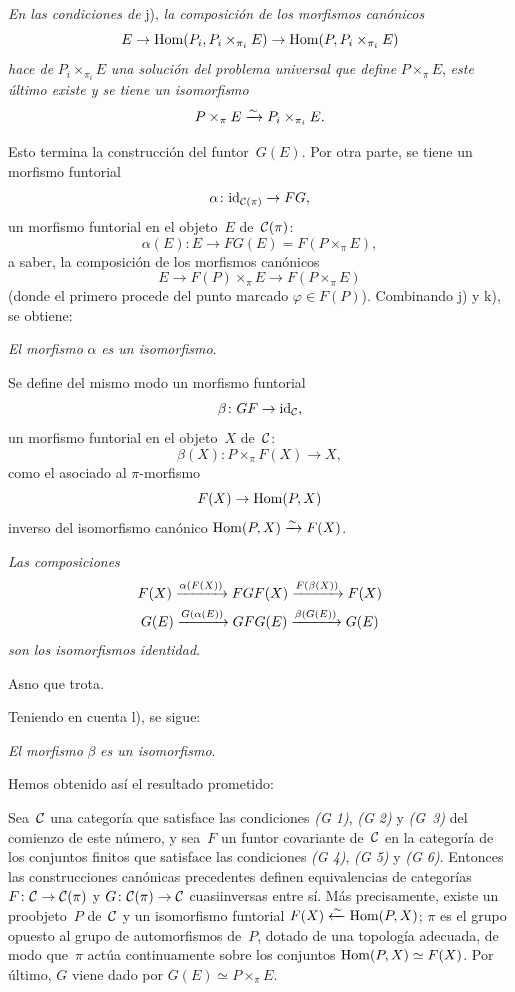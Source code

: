 \begin{enumerateb}
\item[k)] \emph{En las condiciones de} j), \emph{la composición de los
morfismos canónicos}
$$
E\to\Hom(P_i,P_i\times_{\pi_i}E)\to\Hom(P,P_i\times_{\pi_i}E)
$$
\emph{hace de} $P_i\times_{\pi_i}E$ \emph{una solución del problema
universal que define} $P\times_{\pi}E$, \ie \emph{este último existe y se
tiene un isomorfismo}
$$
P\times_{\pi}E\isomto P_i\times_{\pi_i}E.
$$

Esto termina la construcción del funtor~$G(E)$. Por otra parte, se tiene un
morfismo funtorial
$$
\alpha\colon\id_{\cal{C}(\pi)}\to FG,
$$
\ie un morfismo funtorial en el objeto~$E$ de~$\cal{C}(\pi)$:
$$
\alpha(E)\colon E\to FG(E)=F(P\times_{\pi}E),
$$
a saber, la composición de los morfismos canónicos
$$
E\to F(P)\times_{\pi}E\to F(P\times_{\pi}E)
$$
(donde el primero procede del punto marcado $\varphi\in F(P)$). Combinando
j) y k), se obtiene:

\item[l)] \emph{El morfismo} $\alpha$ \emph{es un isomorfismo}.

Se define del mismo modo un morfismo funtorial
$$
\beta\colon GF\to\id_{\cal{C}},
$$
\ie un morfismo funtorial en el objeto~$X$ de~$\cal{C}$:
$$
\beta(X)\colon P\times_{\pi}F(X)\to X,
$$
como
el asociado al $\pi$-morfismo
$$
F(X)\to\Hom(P,X)
$$
inverso del isomorfismo canónico $\Hom(P,X)\isomto F(X)$.

\item[m)] \emph{Las composiciones}
\begin{gather*}
F(X)\lto{\alpha(F(X))}FGF(X)\lto{F(\beta(X))}F(X)\\
G(E)\lto{G(\alpha(E))}GFG(E)\lto{\beta(G(E))}G(E)
\end{gather*}
\emph{son los isomorfismos identidad}.

Asno que trota.

Teniendo en cuenta l), se sigue:

\item[n)] \emph{El morfismo} $\beta$ \emph{es un isomorfismo}.

Hemos obtenido así el resultado prometido:
\end{enumerateb}

\begin{theoreme}
\label{V.4.1}
Sea~$\cal{C}$ una categoría que satisface las condiciones \emph{(G 1)},
\emph{(G 2)} y \emph{(G~3)} del comienzo de este número, y sea~$F$ un
funtor covariante de~$\cal{C}$ en la categoría de los conjuntos finitos que
satisface las condiciones \emph{(G 4)}, \emph{(G 5)} y \emph{(G 6)}.
Entonces las construcciones canónicas precedentes definen equivalencias de
categorías $F\colon\cal{C}\to\cal{C}(\pi)$ y
$G\colon\cal{C}(\pi)\to\cal{C}$ cuasiinversas entre sí. Más precisamente,
existe un proobjeto~$P$ de~$\cal{C}$ y un isomorfismo funtorial
$F(X)\isomfrom\Hom(P,X)$; $\pi$ es el grupo opuesto al grupo de
automorfismos de~$P$, dotado de una topología adecuada, de modo que~$\pi$
actúa continuamente sobre los conjuntos $\Hom(P,X)\simeq F(X)$. Por último,
$G$ viene dado por $G(E)\simeq P\times_{\pi}E$.
\end{theoreme}

